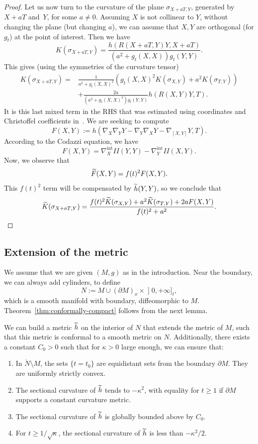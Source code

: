 \documentclass[AHL,Unicode,longabstracts,published]{cedram}
\DeclareMathOperator{\intt}{int}
\theoremstyle{plain}
\newcommand*{\relabel}{\renewcommand{\labelenumi}{(\theenumi)}}
\newcommand*{\romanenumi}{\renewcommand*{\theenumi}{\roman{enumi}}\relabel}
\let\oldtilde\tilde
\renewcommand*{\tilde}[1]{\mathchoice{\widetilde{#1}}{\widetilde{#1}}{\oldtilde{#1}}{\oldtilde{#1}}}
\begin{document}
\begin{proof}
Let us now turn to the curvature of the plane $\sigma_{X+aT,Y}$, generated by $X + aT$ and~$Y$, for some $a\neq 0$. Assuming $X$ is not collinear to $Y$, without changing the plane (but changing $a$), we can assume that $X,Y$ are orthogonal (for $g_t$) at the point of interest. Then we have
\[
K(\sigma_{X+aT, Y}) = \frac{ h(R(X+aT, Y)Y, X+aT)}{(a^2+g_t(X,X))g_t(Y,Y)}.
\]
This gives (using the symmetries of the curvature tensor)
\[
\begin{split}
K(\sigma_{X+aT, Y}) =& \frac{1}{a^2+g_t(X,X)^2}\left(g_t(X,X)^2 K(\sigma_{X,Y}) + a^2 K(\sigma_{T,Y})\right) \\
& + \frac{2a}{(a^2+g_t(X,X)^2)g_t(Y,Y)}h(R(X,Y)Y,T).
\end{split}
\]
It is this last mixed term in the RHS that was estimated using coordinates and Christoffel coefficients in~\cite{Chen-Erchenko-Gogolev}. We are seeking to compute
\[
F(X,Y):= h\left(\nabla_X \nabla_Y Y - \nabla_Y \nabla_X Y - \nabla_{[X,Y]} Y, T\right).
\]
According to the Codazzi equation, we have
\[
F(X,Y)=\nabla_X^{\intt} II(Y,Y) - \nabla_Y^{\intt} II(X,Y).
\]
Now, we observe that
\[
\tilde{F}(X,Y)= f(t)^2 F(X,Y).
\]
This $f(t)^2$ term will be compensated by $\tilde{h}(Y,Y)$, so we conclude that
\[
\tilde{K}(\sigma_{X+aT,Y}) = \frac{ f(t)^2 \tilde{K}(\sigma_{X,Y}) + a^2 \tilde{K}(\sigma_{T,Y}) + 2 a F(X,Y) }{f(t)^2 + a^2}.\qedhere
\]
\end{proof}

\subsection{Extension of the metric}

We assume that we are given $(M,g)$ as in the introduction. Near the boundary, we can always add cylinders, to define
\[
N:= M \cup (\partial M)_x\times\mathopen{]}0, +\infty]_t,
\]
which is a smooth manifold with boundary, diffeomorphic to $M$. Theorem~\ref{thm:conformally-compact} follows from the next lemma.

\begin{lemm}\label{lemma:extension}
We can build a metric $\tilde{h}$ on the interior of $N$ that extends the metric of $M$, such that this metric is conformal to a smooth metric on $N$. Additionally, there exists a constant $C_0>0$ such that for $\kappa>0$ large enough, we can ensure that:
\begin{enumerate}\romanenumi
\item\label{lemm2.2.1} In $\mathring{N}\setminus M$, the sets $\{t=t_0\}$ are equidistant sets from the boundary $\partial M$. They are uniformly strictly convex.
\item\label{lemm2.2.2} The sectional curvature of $\tilde{h}$ tends to $-\kappa^2$, with equality for $t\geq 1$ if $\partial M$ supports a constant curvature metric.
\item\label{lemm2.2.3} The sectional curvature of $\tilde{h}$ is globally bounded above by $C_0$.
\item\label{lemm2.2.4} For $t\geq 1/\sqrt{\kappa}$, the sectional curvature of $\tilde{h}$ is less than $-\kappa^2/2$.
\end{enumerate}
\end{lemm}
\end{document}
